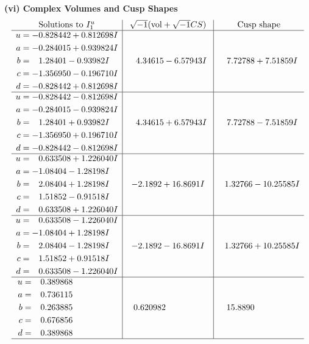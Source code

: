 \documentclass[1p]{elsarticle_modified}
\theoremstyle{definition}
\newcommand{\I}{\sqrt{-1}}
\begin{document}
\newpage\flushleft \textbf{(vi) Complex Volumes and Cusp Shapes}
$$\begin{array}{c|c|c}  
\text{Solutions to }I^u_{1}& \I (\text{vol} + \sqrt{-1}CS) & \text{Cusp shape}\\
 \hline 
\begin{aligned}
u &= -0.828442 + 0.812698 I \\
a &= -0.284015 + 0.939824 I \\
b &= \phantom{-}1.28401 - 0.93982 I \\
c &= -1.356950 - 0.196710 I \\
d &= -0.828442 + 0.812698 I\end{aligned}
 & \phantom{-}4.34615 - 6.57943 I & \phantom{-}7.72788 + 7.51859 I \\ \hline\begin{aligned}
u &= -0.828442 - 0.812698 I \\
a &= -0.284015 - 0.939824 I \\
b &= \phantom{-}1.28401 + 0.93982 I \\
c &= -1.356950 + 0.196710 I \\
d &= -0.828442 - 0.812698 I\end{aligned}
 & \phantom{-}4.34615 + 6.57943 I & \phantom{-}7.72788 - 7.51859 I \\ \hline\begin{aligned}
u &= \phantom{-}0.633508 + 1.226040 I \\
a &= -1.08404 - 1.28198 I \\
b &= \phantom{-}2.08404 + 1.28198 I \\
c &= \phantom{-}1.51852 - 0.91518 I \\
d &= \phantom{-}0.633508 + 1.226040 I\end{aligned}
 & -2.1892 + 16.8691 I & \phantom{-}1.32766 - 10.25585 I \\ \hline\begin{aligned}
u &= \phantom{-}0.633508 - 1.226040 I \\
a &= -1.08404 + 1.28198 I \\
b &= \phantom{-}2.08404 - 1.28198 I \\
c &= \phantom{-}1.51852 + 0.91518 I \\
d &= \phantom{-}0.633508 - 1.226040 I\end{aligned}
 & -2.1892 - 16.8691 I & \phantom{-}1.32766 + 10.25585 I \\ \hline\begin{aligned}
u &= \phantom{-}0.389868\phantom{ +0.000000I} \\
a &= \phantom{-}0.736115\phantom{ +0.000000I} \\
b &= \phantom{-}0.263885\phantom{ +0.000000I} \\
c &= \phantom{-}0.676856\phantom{ +0.000000I} \\
d &= \phantom{-}0.389868\phantom{ +0.000000I}\end{aligned}
 & \phantom{-}0.620982\phantom{ +0.000000I} & \phantom{-}15.8890\phantom{ +0.000000I}\\
 \hline 
 \end{array}$$\newpage\newpage\renewcommand{\arraystretch}{1}
\end{document}
